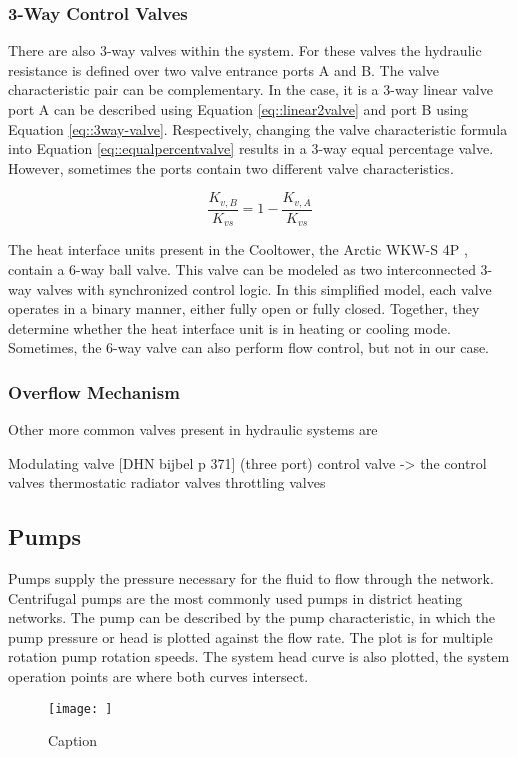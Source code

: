 \subsubsection{3-Way Control Valves}
There are also 3-way valves within the system. For these valves the hydraulic resistance is defined over two valve entrance ports A and B.
The valve characteristic pair can be complementary. In the case, it is a 3-way linear valve port A can be described using Equation \ref{eq::linear2valve} and port B using Equation \ref{eq::3way-valve}. Respectively, changing the valve characteristic formula into Equation \ref{eq::equalpercentvalve} results in a 3-way equal percentage valve. However, sometimes the ports contain two different valve characteristics. 

\begin{equation}\label{eq::3way-valve}
    \frac{K_{v,B}}{K_{vs}} = 1 - \frac{K_{v,A}}{K_{vs}}
\end{equation}

The heat interface units present in the Cooltower, the Arctic WKW-S 4P \cite{fortes_wkw_s_4p}, contain a 6-way ball valve. This valve can be modeled as two interconnected 3-way valves with synchronized control logic. In this simplified model, each valve operates in a binary manner, either fully open or fully closed. Together, they determine whether the heat interface unit is in heating or cooling mode. Sometimes, the 6-way valve can also perform flow control, but not in our case.

\subsubsection{Overflow Mechanism}

Other more common valves present in hydraulic systems are 

Modulating valve [DHN bijbel p 371]
(three port) control valve -> the control valves 
thermostatic radiator valves
throttling valves

\subsection{Pumps}
Pumps supply the pressure necessary for the fluid to flow through the network. Centrifugal pumps are the most
commonly used pumps in district heating networks. The pump can be described by the pump characteristic, in which the pump pressure or head is plotted against the flow rate. The plot is for multiple rotation pump rotation speeds. The system head curve is also plotted, the system operation points are where both curves intersect. 
\begin{figure}
    \centering
    \texttt{[image: ]}
    \caption{Caption}
    \label{fig:enter-label}
\end{figure}

